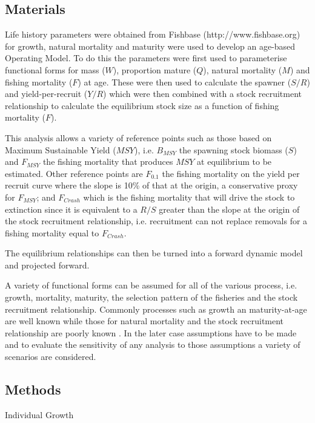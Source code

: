 \documentclass[preprint,review,12pt]{elsarticle}
\begin{document}
\subsection{Materials}


Life history parameters were obtained from Fishbase (http://www.fishbase.org) for growth, natural mortality and maturity were used to develop an age-based Operating Model. To do this the parameters were first used to parameterise functional forms for mass ($W$), proportion mature ($Q$), natural mortality ($M$) and fishing mortality ($F$) at age. These were then used to calculate the  spawner ($S/R$) and yield-per-recruit ($Y/R$) which were then combined with a stock recruitment relationship \cite{sissenwine1987alternative} to calculate the equilibrium stock size as a function of fishing mortality ($F$). 

This analysis allows a variety of reference points such as those based on Maximum Sustainable Yield ($MSY$), i.e. $B_{MSY}$ the spawning stock biomass ($S$) and $F_{MSY}$ the fishing mortality that produces $MSY$ at equilibrium to be estimated. Other reference points are $F_{0.1}$ the fishing mortality on the yield per recruit curve where the slope is 10\% of that at the origin, a conservative proxy for $F_{MSY}$; and
$F_{Crash}$ which is the fishing mortality that will drive the stock to extinction since it is equivalent to a $R/S$ greater than the slope at the origin of the stock recruitment relationship, i.e. recruitment can not replace removals for a fishing mortality equal to $F_{Crash}$.  

The equilibrium relationships can then be turned into a forward dynamic model and projected forward.

A variety of functional forms can be assumed for all of the various process, i.e. growth, mortality, maturity, the selection pattern of the fisheries and the stock recruitment relationship. Commonly processes such as growth an maturity-at-age are well known while those for natural mortality and the stock recruitment relationship are poorly known \cite{michielsens2004bayesian}. In the later case assumptions have to be made and to evaluate the sensitivity of any analysis to those assumptions a variety of scenarios are considered. 

\subsection{Methods}

Individual Growth
\end{document}
